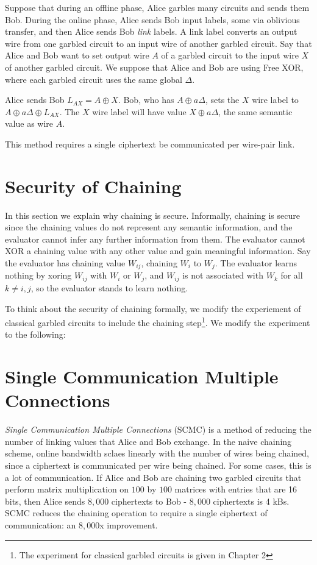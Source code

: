 Suppose that during an offline phase, Alice garbles many circuits and sends them Bob.
During the online phase, Alice sends Bob input labels, some via oblivious transfer, and then Alice sends Bob \textit{link} labels.
A link label converts an output wire from one garbled circuit to an input wire of another garbled circuit.
Say that Alice and Bob want to set output wire $A$ of a garbled circuit to the input wire $X$ of another garbled circuit.
We suppose that Alice and Bob are using Free XOR, where each garbled circuit uses the same global $\Delta$.

Alice sends Bob $L_{AX} = A \oplus X$.
Bob, who has $A \oplus a\Delta$, sets the $X$ wire label to $A \oplus a\Delta \oplus L_{AX}$.
The $X$ wire label will have value $X \oplus a\Delta$, the same semantic value as wire $A$.

This method requires a single ciphertext be communicated per wire-pair link.

\section{Security of Chaining}
In this section we explain why chaining is secure.
Informally, chaining is secure since the chaining values do not represent any semantic information, and the evaluator cannot infer any further information from them.
The evaluator cannot XOR a chaining value with any other value and gain meaningful information.
Say the evaluator has chaining value $W_{ij}$, chaining $W_i$ to $W_j$. 
The evaluator learns nothing by xoring $W_{ij}$ with $W_i$ or $W_j$, and $W_{ij}$ is not associated with $W_k$ for all $k \neq i,j$, so the evaluator stands to learn nothing.

To think about the security of chaining formally, we modify the experiement of classical garbled circuits to include the chaining step\footnote{The experiment for classical garbled circuits is given in Chapter 2}.
We modify the experiment to the following:


\section{Single Communication Multiple Connections}
\textit{Single Communication Multiple Connections} (SCMC) is a method of reducing the number of linking values that Alice and Bob exchange.
In the naive chaining scheme, online bandwidth sclaes linearly with the number of wires being chained, since a ciphertext is communicated per wire being chained.
For some cases, this is a lot of communication.
If Alice and Bob are chaining two garbled circuits that perform matrix multiplication on $100$ by $100$ matrices with entries that are 16 bits, then Alice sends $8,000$ ciphertexts to Bob - $8,000$ ciphertexts is 4 kBs.
SCMC reduces the chaining operation to require a single ciphertext of communication: an $8,000$x improvement.

